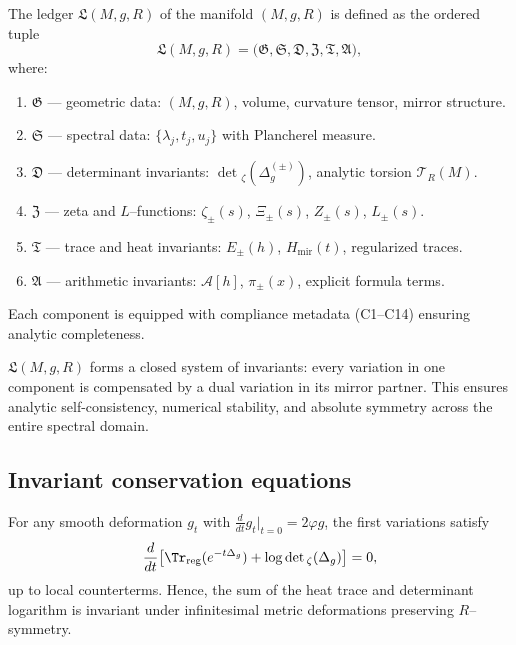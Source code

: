 \begin{definition}
\label{def:ledger-schema}
The ledger $\mathfrak{L}(M,g,R)$ of the manifold $(M,g,R)$ is defined as the ordered tuple
\[
\mathfrak{L}(M,g,R)
=\big(\mathfrak{G},\mathfrak{S},\mathfrak{D},\mathfrak{Z},\mathfrak{T},\mathfrak{A}\big),
\]
where:
\begin{enumerate}[label=\arabic*.,leftmargin=*,itemsep=2pt]
  \item $\mathfrak{G}$ — geometric data: $(M,g,R)$, volume, curvature tensor, mirror structure.  
  \item $\mathfrak{S}$ — spectral data: $\{\lambda_j,t_j,u_j\}$ with Plancherel measure.  
  \item $\mathfrak{D}$ — determinant invariants: $\det{}_{\zeta}(\Delta_g^{(\pm)})$, analytic torsion $\mathcal{T}_R(M)$.  
  \item $\mathfrak{Z}$ — zeta and $L$–functions: $\zeta_\pm(s)$, $\Xi_\pm(s)$, $Z_\pm(s)$, $L_\pm(s)$.  
  \item $\mathfrak{T}$ — trace and heat invariants: $E_\pm(h)$, $H_{\mathrm{mir}}(t)$, regularized traces.  
  \item $\mathfrak{A}$ — arithmetic invariants: $\mathcal{A}[h]$, $\pi_\pm(x)$, explicit formula terms.
\end{enumerate}
Each component is equipped with compliance metadata (C1–C14) ensuring analytic completeness. %
\end{definition}

\begin{remark}
\label{rem:ledger-principle}
$\mathfrak{L}(M,g,R)$ forms a closed system of invariants:  
every variation in one component is compensated by a dual variation in its mirror partner.  
This ensures analytic self-consistency, numerical stability, and absolute symmetry across the entire spectral domain. %
\end{remark}

\subsection{Invariant conservation equations}
\label{subsec:ch6-part9-conservation} \relax

\begin{theorem}
\label{thm:spec-geom-conservation}
For any smooth deformation $g_t$ with $\frac{d}{dt}g_t|_{t=0}=2\varphi g$, the first variations satisfy
\[
\frac{d}{dt}\big[\Tr_{\mathrm{reg}}(e^{-t\Delta_g}) + \log\det{}_{\zeta}(\Delta_g)\big]
=0,
\]
up to local counterterms.  
Hence, the sum of the heat trace and determinant logarithm is invariant under infinitesimal metric deformations preserving $R$–symmetry. %
\end{theorem}

